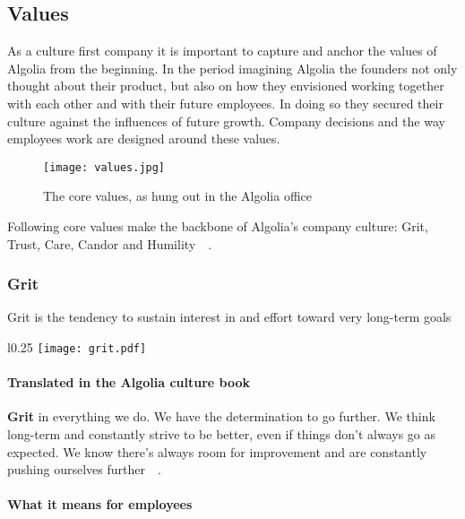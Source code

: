 \subsection{Values}
\label{sub:values}

As a culture first company it is important to capture and anchor the values of Algolia from the beginning. In the period imagining Algolia the founders not only thought about their product, but also on how they envisioned working together with each other and with their future employees. In doing so they secured their culture against the influences of future growth. Company decisions and the way employees work are designed around these values.

\begin{figure}[H]
  \centering
  \texttt{[image: values.jpg]}
  \caption{The core values, as hung out in the Algolia office\cite{culture-first}}
  \label{figure:values}
\end{figure}

Following core values make the backbone of Algolia's company culture: Grit, Trust, Care, Candor and Humility~\cite{algolia-values}~. 

\subsubsection{Grit}
\label{ssub:grit}

\begin{definition}
Grit is the tendency to sustain interest in and effort toward very long-term goals\cite{Duckworth201605}
\end{definition}

\begin{wrapfigure}{l}{0.25\textwidth}
  \centering
  \texttt{[image: grit.pdf]}
\end{wrapfigure}

\paragraph{Translated in the Algolia culture book}

\textbf{Grit} in everything we do. We have the determination to go further. We think long-term and constantly strive to be better, even if things don't always go as expected. We know there's always room for improvement and are constantly pushing ourselves further~\cite{algolia-careers}~.

\paragraph{What it means for employees} 

